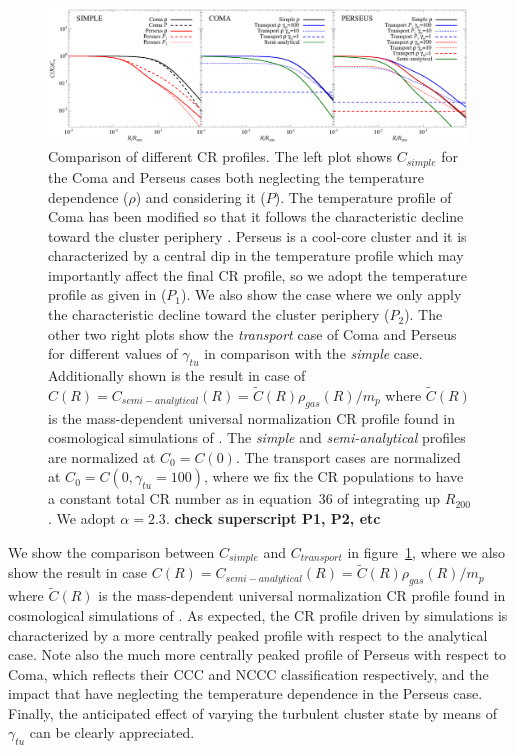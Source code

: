 \documentclass[traditabstract]{aa}
\begin{document}
\begin{appendix}
\begin{figure}[hbt!]
\centering
\includegraphics[width=0.99\textwidth]{figures/CR_profiles_simple_comparison.eps}
\caption{Comparison of different CR profiles. The left plot shows $C_{simple}$ for the Coma and Perseus cases both neglecting the temperature dependence ($\rho$) and considering it ($P$). The temperature profile of Coma has been modified so that it follows the characteristic decline toward the cluster periphery \citep{2007MNRAS.378..385P,2010MNRAS.409..449P}. Perseus is a cool-core cluster and it is characterized by a central dip in the temperature profile which may importantly affect the final CR profile, so we adopt the temperature profile as given in \citep{2004A&A...413...17P} ($P_{1}$). We also show the case where we only apply the characteristic decline toward the cluster periphery ($P_{2}$). The other two right plots show the \emph{transport} case of Coma and Perseus for different values of $\gamma_{tu}$ in comparison with the \emph{simple} case. Additionally shown is the result in case of $C(R)=C_{semi-analytical}(R)=\tilde{C}(R)\rho_{gas}(R)/m_{p}$ where $\tilde{C}(R)$ is the mass-dependent universal normalization CR profile found in cosmological simulations of \cite{2010MNRAS.409..449P}. The \emph{simple} and \emph{semi-analytical} profiles are normalized at $C_{0}=C(0)$. The transport cases are normalized at $C_{0}=C(0,\gamma_{tu}=100)$, where we fix the CR populations to have a constant total CR number as in equation~36 of \cite{2011A&A...527A..99E} integrating up $R_{200}$. We adopt $\alpha=2.3$. {\bf check superscript P1, P2, etc}}
\label{fig:simpleVStransport}
\end{figure}

We show the comparison between $C_{simple}$ and $C_{transport}$ in figure~\ref{fig:simpleVStransport}, where we also show the result in case $C(R)=C_{semi-analytical}(R)=\tilde{C}(R)\rho_{gas}(R)/m_{p}$ where $\tilde{C}(R)$ is the mass-dependent universal normalization CR profile found in cosmological simulations of \cite{2010MNRAS.409..449P}. As expected, the CR profile driven by simulations is characterized by a more centrally peaked profile with respect to the analytical case. Note also the much more centrally peaked profile of Perseus with respect to Coma, which reflects their CCC and NCCC classification respectively, and the impact that have neglecting the temperature dependence in the Perseus case. Finally, the anticipated effect of varying the turbulent cluster state by means of $\gamma_{tu}$ can be clearly appreciated.


\end{appendix}
\end{document}
